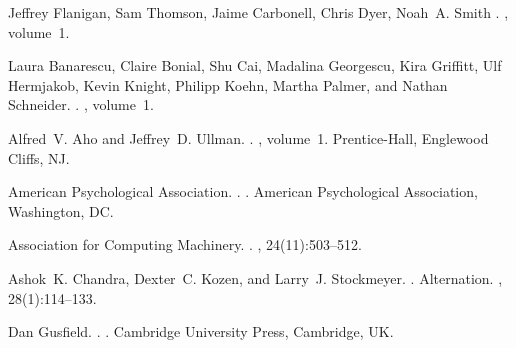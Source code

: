\documentclass[11pt]{article}
\begin{document}
\begin{thebibliography}{}

Jeffrey Flanigan, Sam Thomson, Jaime Carbonell, Chris Dyer, Noah~A. Smith
.
, volume~1.

Laura Banarescu, Claire Bonial, Shu Cai, Madalina Georgescu, Kira Griffitt, Ulf Hermjakob, Kevin Knight, Philipp Koehn, Martha Palmer, and Nathan Schneider.
.
, volume~1.

Alfred~V. Aho and Jeffrey~D. Ullman.
.
, volume~1.
\newblock Prentice-{Hall}, Englewood Cliffs, NJ.

{American Psychological Association}.
.
.
\newblock American Psychological Association, Washington, DC.

{Association for Computing Machinery}.
.
, 24(11):503--512.

Ashok~K. Chandra, Dexter~C. Kozen, and Larry~J. Stockmeyer.
.
\newblock Alternation.
,
  28(1):114--133.

Dan Gusfield.
.
.
\newblock Cambridge University Press, Cambridge, UK.

\end{thebibliography}
\end{document}
